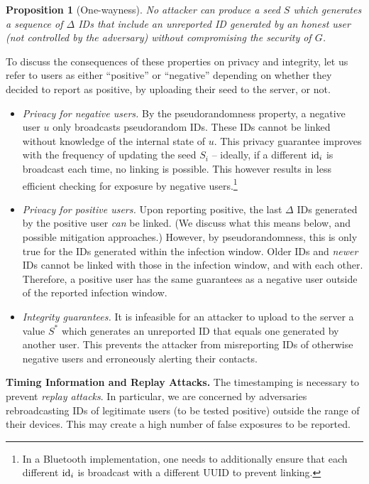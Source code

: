 \documentclass{article}
\newtheorem{proposition}{Proposition}
\begin{document}
\begin{proposition}[One-wayness]
   No attacker can produce a seed $S$ which generates a sequence of $\Delta$ IDs that include an unreported ID generated by an honest user (not controlled by the adversary) without compromising the security of $G$.
\end{proposition}

To discuss the consequences of these properties on privacy and integrity, let us refer to users as either ``positive'' or ``negative'' depending on whether they decided to report as positive, by uploading their seed to the server, or not. 
\begin{itemize}
    \item {\em Privacy for negative users.}  By the pseudorandomness property, a negative user $u$ only broadcasts pseudorandom IDs. These IDs cannot be linked without knowledge of the internal state of $u$. This privacy guarantee improves with the frequency of updating the seed $S_i$ -- ideally, if a different $\mathrm{id}_i$ is broadcast each time, no linking is possible. This however results in less efficient checking for exposure by negative users.\footnote{In a Bluetooth implementation, one needs to additionally ensure that each different $\mathrm{id}_i$ is broadcast with a different UUID to prevent linking.}
    \item {\em Privacy for positive users.} Upon reporting positive, the last $\Delta$ IDs generated by the positive user {\em can} be linked. (We discuss what this means below, and possible mitigation approaches.) However, by pseudorandomness, this is only true for the IDs generated within the infection window. Older IDs and {\em newer} IDs cannot be linked with those in the infection window, and with each other. Therefore, a positive user has the same guarantees as a negative user outside of the reported infection window.
    \item {\em Integrity guarantees.} It is infeasible for an attacker to upload to the server a value $S^*$ which generates an unreported ID that equals one generated by another user. This prevents the attacker from misreporting IDs of otherwise negative users and erroneously alerting their contacts.  
\end{itemize}

{\bf Timing Information and Replay Attacks.} 
The timestamping is necessary to prevent {\em replay attacks}. In particular, we are concerned by adversaries rebroadcasting IDs of legitimate users (to be tested positive) outside the range of their devices. This may create a high number of false exposures to be reported. 
\end{document}
